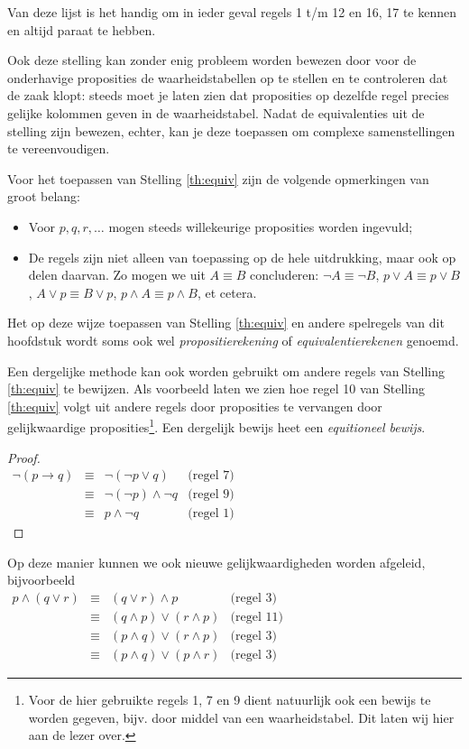 Van deze lijst is het handig om in ieder geval regels 1 t/m 12 en 16, 17 te kennen en altijd paraat te hebben.

Ook deze stelling kan zonder enig probleem worden bewezen door voor de onderhavige proposities de waarheidstabellen op te stellen en te controleren dat de zaak klopt: steeds moet je laten zien dat proposities op dezelfde regel precies gelijke kolommen geven in de waarheidstabel. Nadat de equivalenties uit de stelling zijn bewezen, echter, kan je deze toepassen om complexe samenstellingen te vereenvoudigen.

Voor het toepassen van Stelling \ref{th:equiv} zijn de volgende opmerkingen van groot belang:
\begin{itemize}
\item Voor $p, q, r,\ldots$ mogen steeds willekeurige proposities worden ingevuld;
\item De regels zijn niet alleen van toepassing op de hele uitdrukking, maar ook op delen daarvan. Zo mogen we uit $A\equiv B$ concluderen: $\neg A\equiv\neg B$, $p\lor A\equiv p\lor B$, $A\lor p\equiv B\lor p$, $p\land  A\equiv p\land B$, et cetera.
\end{itemize}

Het op deze wijze toepassen van Stelling \ref{th:equiv} en andere spelregels van dit hoofdstuk wordt soms ook wel \textit{propositierekening} of \textit{equivalentierekenen} genoemd.

Een dergelijke methode kan ook worden gebruikt om andere regels van Stelling \ref{th:equiv} te bewijzen. Als voorbeeld laten we zien hoe regel 10 van Stelling \ref{th:equiv} volgt uit andere regels door proposities te vervangen door gelijkwaardige proposities\footnote{Voor de hier gebruikte regels 1, 7 en 9 dient natuurlijk ook een bewijs te worden gegeven, bijv. door middel van een waarheidstabel. Dit laten wij hier aan de lezer over.}. Een dergelijk bewijs heet een \textit{equitioneel bewijs}.
\begin{proof}\mbox{}\\
$\begin{array}{llll}
\neg(p\rightarrow q) & \equiv & \neg(\neg p\lor q) & \text{(regel 7)}\\
& \equiv & \neg(\neg p)\land\neg q & \text{(regel 9)} \\
& \equiv & p\land\neg q & \text{(regel 1)}
\end{array}$\\
\end{proof}

Op deze manier kunnen we ook nieuwe gelijkwaardigheden worden afgeleid, bijvoorbeeld\\
$\begin{array}{llll}
p\land(q\lor r) & \equiv & (q\lor r)\land p & \text{(regel 3)} \\
& \equiv & (q\land p)\lor(r\land p) & \text{(regel 11)} \\
& \equiv & (p\land q)\lor(r\land p) & \text{(regel 3)} \\
& \equiv & (p\land q)\lor(p\land r) & \text{(regel 3)}
\end{array}$

